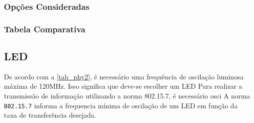 	
	\subsubsection{Opções Consideradas}\label{uc-options}
	
	\lipsum[14]
	
	\subsubsection{Tabela Comparativa}\label{uc-table}
	
	\lipsum[15]
	
	\subsection{LED}\label{hard-led}
	
	De acordo com a \autoref{tab_phy2}, é necessário uma frequência de oscilação luminosa máxima de 120MHz. Isso significa que deve-se escolher um LED 
	Para realizar a transmissão de informação utilizando a norma 802.15.7, é necessário osci
	A norma \texttt{802.15.7} informa a frequencia mínima de oscilação de um LED em função da taxa de transferência desejada.
	
